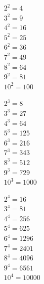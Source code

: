 \documentclass[12pt]{article}
\begin{document}
\begin{multicols}{3}

$2^2=4$\\

$3^2=9$\\

$4^2=16$\\

$5^2=25$\\

$6^2=36$\\

$7^2=49$\\

$8^2=64$\\

$9^2=81$\\

$10^2=100$\\

\vfill

$2^3=8$\\

$3^3=27$\\

$4^3=64$\\

$5^3=125$\\

$6^3=216$\\

$7^3=343$\\

$8^3=512$\\

$9^3=729$\\

$10^3=1000$\\

\vfill

$2^4=16$\\

$3^4=81$\\

$4^4=256$\\

$5^4=625$\\

$6^4=1296$\\

$7^4=2401$\\

$8^4=4096$\\

$9^4=6561$\\

$10^4=10000$\\

\vfill

\end{multicols}
\end{document}

